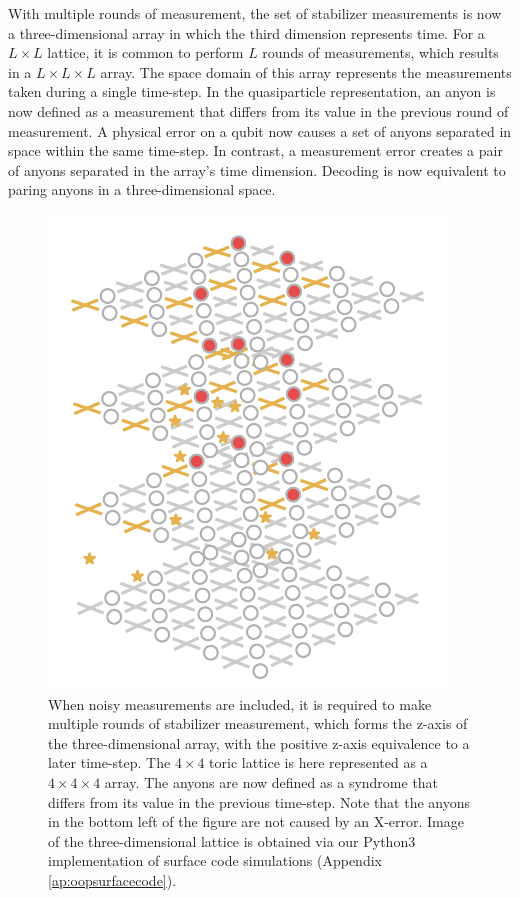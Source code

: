 With multiple rounds of measurement, the set of stabilizer measurements is now a three-dimensional array in which the third dimension represents time. For a $L\times L$ lattice, it is common to perform $L$ rounds of measurements, which results in a $L \times L \times L$ array. The space domain of this array represents the measurements taken during a single time-step. In the quasiparticle representation, an anyon is now defined as a measurement that differs from its value in the previous round of measurement. A physical error on a qubit now causes a set of anyons separated in space within the same time-step. In contrast, a measurement error creates a pair of anyons separated in the array's time dimension. Decoding is now equivalent to paring anyons in a three-dimensional space. 

\begin{figure}[htbp]
  \centering
  \includegraphics[width=.5\textwidth]{fig/3dlattice.pdf}
  \hspace{1cm}
  \caption{When noisy measurements are included, it is required to make multiple rounds of stabilizer measurement, which forms the z-axis of the three-dimensional array, with the positive z-axis equivalence to a later time-step. The $4\times 4$ toric lattice is here represented as a $4\times 4\times 4$ array. The anyons are now defined as a syndrome that differs from its value in the previous time-step. Note that the anyons in the bottom left of the figure are not caused by an X-error. Image of the three-dimensional lattice is obtained via our Python3 implementation of surface code simulations (Appendix \ref{ap:oopsurfacecode}).}
\end{figure}

